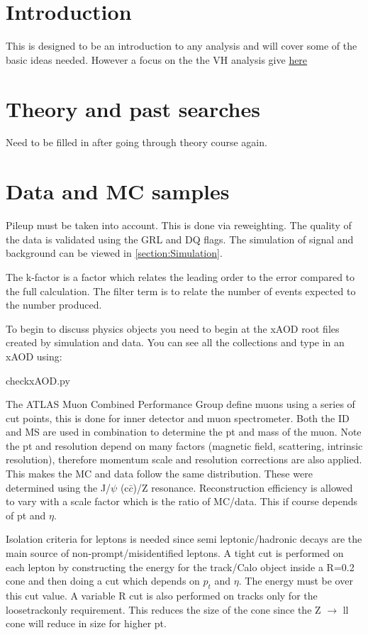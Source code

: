 \section{Introduction}
This is designed to be an introduction to any analysis and will cover some of the basic ideas needed. However a focus on the the VH analysis give \href{https://cds.cern.ch/record/2054042/files/ATL-COM-PHYS-2015-1180.pdf}{here}

\section{Theory and past searches}
Need to be filled in after going through theory course again.

\section{Data and MC samples}

Pileup must be taken into account. This is done via reweighting. The quality of the data is validated using the GRL and DQ flags. The simulation of signal and background can be viewed in \ref{section:Simulation}. 

The k-factor is a factor which relates the leading order to the error compared to the full calculation. The filter term is to relate the number of events expected to the number produced. 

To begin to discuss physics objects you need to begin at the xAOD root files created by simulation and data. You can see all the collections and type in an xAOD using:

checkxAOD.py 


The ATLAS Muon Combined Performance Group define muons using a series of cut points, this is done for inner detector and muon spectrometer. Both the ID and MS are used in combination to determine the pt and mass of the muon. Note the pt and resolution depend on many factors (magnetic field, scattering, intrinsic resolution), therefore momentum scale and resolution corrections are also applied. This makes the MC and data follow the same distribution. These were determined using the J/$\psi$ (c$\bar{c}$)/Z resonance.  Reconstruction efficiency is allowed to vary with a scale factor which is the ratio of MC/data. This if course depends of pt and $\eta$. 

Isolation criteria for leptons is needed since semi leptonic/hadronic decays are the main source of non-prompt/misidentified leptons. A tight cut is performed on each lepton by constructing the energy for the track/Calo object inside a R=0.2 cone and then doing a cut which depends on $p_t$ and $\eta$. The energy must be over this cut value. A variable R cut is also performed on tracks only for the loosetrackonly requirement. This reduces the size of the cone since the Z $\rightarrow$  ll cone will reduce in size for higher pt.   


